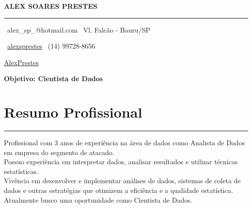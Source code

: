 \documentclass[10pt]{article}
\begin{document}

{\large\bf ALEX SOARES PRESTES \hfill} %
 
\vspace{-5pt}
\rule{\linewidth}{1pt}

{\faEnvelope \ alex{\_}sp\_@hotmail.com \hfill \faHome \ Vl. Falcão - Bauru/SP}

{\faLinkedinSquare \ \href{https://www.linkedin.com/in/alexsprestes/}{alexsprestes} \hfill \faWhatsapp \ (14) 99728-8656 }

{\faGithub \href{https://github.com/AlexPrestes/}{AlexPrestes} \hfill }



\vspace{10pt}
\centerline{\large\bf Objetivo: Cientista de Dados}

 
\section*{Resumo Profissional}
\vspace{-15pt}
\rule{\linewidth}{1pt}

Profissional com 3 anos de experiência na área de dados como Analista de Dados em empresa do segmento de atacado.
\\

Possuo experiência em interpretar dados, analisar resultados e utilizar técnicas estatísticas.
\\

Vivência em desenvolver e implementar análises de dados, sistemas de coleta de dados e outras estratégias que otimizem a eficiência e a qualidade estatística.
\\

Atualmente busco uma oportunidade como Cientista de Dados.
\\
\end{document}
